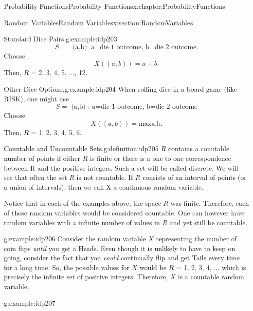 \documentclass[oneside,10pt,]{book}
\numberwithin{equation}{section}
\begin{document}
\begin{chapterptx}{Probability Functions}{}{Probability Functions}{}{}{x:chapter:ProbabilityFunctions}
\begin{sectionptx}{Random Variables}{}{Random Variables}{}{}{x:section:RandomVariables}
\begin{example}{Standard Dice Pairs.}{g:example:idp203}
\begin{equation*}
S = \text{ {(a,b): a=die 1 outcome, b=die 2 outcome}}.
\end{equation*}
Choose%
\begin{equation*}
X( (a,b) ) = a+b.
\end{equation*}
Then, \(R\) = \textbraceleft{}2, 3, 4, 5, ..., 12\textbraceright{}.%
\end{example}
%
\par
\begin{example}{Other Dice Options.}{g:example:idp204}%
When rolling dice in a board game (like RISK), one might use%
\begin{equation*}
S= \text{{ (a,b) : a=die 1 outcome, b=die 2 outcome}}
\end{equation*}
Choose%
\begin{equation*}
X( (a,b) ) = \text{max{a,b}}.
\end{equation*}
Then, \(R\) = \textbraceleft{}1, 2, 3, 4, 5, 6\textbraceright{}.%
\end{example}
%
\par
\begin{definition}{Countable and Uncountable Sets.}{g:definition:idp205}%
\(R\) contains a countable number of points if either \(R\) is finite or there is a one to one correspondence between R and the positive integers. Such a set will be called discrete. We will see that often the set \(R\) is not countable. If \(R\) consists of an interval of points (or a union of intervals), then we call X a continuous random variable.%
\end{definition}
%
\par
Notice that in each of the examples above, the space \(R\) was finite. Therefore, each of those random variables would be considered countable. One can however have random variables with a infinite number of values in \(R\) and yet still be countable.%
\par
\begin{example}{}{g:example:idp206}%
Consider the random variable \(X\) representing the number of coin flips \emph{until} you get a Heads.  Even though it is unlikely to have to keep on going, consider the fact that you \emph{could} continually flip and get Tails every time for a long time.  So, the possible values for \(X\) would be \(R\) = \textbraceleft{}1, 2, 3, 4, ... \textbraceright{} which is precisely the infinite set of positive integers.  Therefore, \(X\) is a countable random variable.%
\end{example}
%
\par
\begin{example}{}{g:example:idp207}%

\end{example}
\end{sectionptx}
\end{chapterptx}
\end{document}
